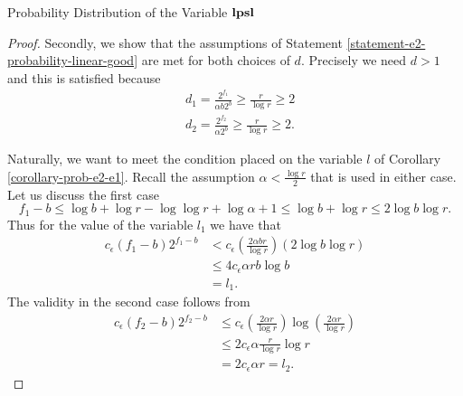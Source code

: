 \begin{section}{Probability Distribution of the Variable \texorpdfstring{$\mathbf{lpsl}$}{lpsl}}
\begin{proof}
Secondly, we show that the assumptions of Statement \ref{statement-e2-probability-linear-good} are met for both choices of $d$. Precisely we need $d > 1$ and this is satisfied because
\[
\begin{split}
& d_1 = \frac{2 ^ {f_1}}{\alpha b 2 ^ b} \geq \frac{r}{\log r} \geq 2 \\
& d_2 = \frac{2 ^ {f_2}}{\alpha 2 ^ b} \geq \frac{r}{\log r} \geq 2 \text{.}
\end{split}
\]

Naturally, we want to meet the condition placed on the variable $l$ of Corollary \ref{corollary-prob-e2-e1}. Recall the assumption $\alpha < \frac{\log r}{2}$ that is used in either case. Let us discuss the first case
\[ 
	f_1 - b \leq \log b + \log r - \log \log r + \log \alpha + 1 \leq \log b + \log r \leq 2 \log b \log r \text{.} 
\] Thus for the value of the variable $l_1$ we have that 
\[
\begin{split}
c_{\epsilon} (f_1 - b) 2 ^ {f_1 - b}
	& < c_{\epsilon} \left(\frac{2 \alpha b r}{\log r} \right) \left(2 \log b \log r \right) \\
	& \leq 4 c_{\epsilon} \alpha r b \log b \\
	& = l_1 \text{.}
\end{split}
\]
The validity in the second case follows from
\[
\begin{split}
c_\epsilon (f_2 - b) 2 ^ {f_2 - b}
	& \leq c_\epsilon \left(\frac{2 \alpha r}{\log r}\right) \log \left( \frac{2 \alpha r}{\log r} \right) \\
	& \leq 2 c_\epsilon \alpha \frac{r}{\log r} \log r \\
	& = 2 c_\epsilon \alpha r = l_2 \text{.}
\end{split}
\]



\end{proof}
\end{section}
